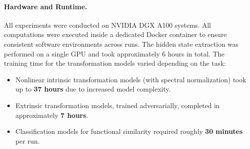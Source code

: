 \paragraph{Hardware and Runtime.}
All experiments were conducted on NVIDIA DGX A100 systems.
All computations were executed inside a dedicated Docker container to ensure consistent software environments across runs.
The hidden state extraction was performed on a single GPU and took approximately 6 hours in total.
The training time for the transformation models varied depending on the task:
\begin{itemize}
\item Nonlinear intrinsic transformation models (with spectral normalization) took up to \textbf{37 hours} due to increased model complexity.
\item Extrinsic transformation models, trained adversarially, completed in approximately \textbf{7 hours}.
\item Classification models for functional similarity required roughly \textbf{30 minutes} per run.
\end{itemize}

